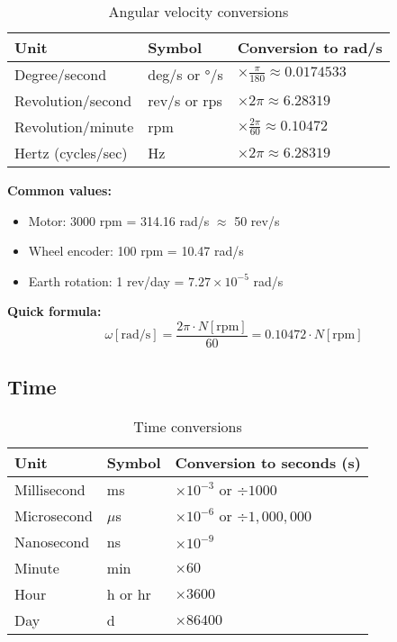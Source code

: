 \begin{table}[H]
\centering
\begin{tabular}{|l|l|l|}
\hline
\rowcolor{blue!20}
\textbf{Unit} & \textbf{Symbol} & \textbf{Conversion to rad/s} \\
\hline
Degree/second & deg/s or °/s & $\times \frac{\pi}{180} \approx 0.0174533$ \\
\hline
Revolution/second & rev/s or rps & $\times 2\pi \approx 6.28319$ \\
\hline
Revolution/minute & rpm & $\times \frac{2\pi}{60} \approx 0.10472$ \\
\hline
Hertz (cycles/sec) & Hz & $\times 2\pi \approx 6.28319$ \\
\hline
\end{tabular}
\caption{Angular velocity conversions}
\end{table}

\textbf{Common values:}
\begin{itemize}
    \item Motor: 3000 rpm = 314.16 rad/s $\approx$ 50 rev/s
    \item Wheel encoder: 100 rpm = 10.47 rad/s
    \item Earth rotation: 1 rev/day = $7.27 \times 10^{-5}$ rad/s
\end{itemize}

\textbf{Quick formula:}
\begin{equation}
\omega[\text{rad/s}] = \frac{2\pi \cdot N[\text{rpm}]}{60} = 0.10472 \cdot N[\text{rpm}]
\end{equation}

\subsection{Time}

\begin{table}[H]
\centering
\begin{tabular}{|l|l|l|}
\hline
\rowcolor{blue!20}
\textbf{Unit} & \textbf{Symbol} & \textbf{Conversion to seconds (s)} \\
\hline
Millisecond & ms & $\times 10^{-3}$ or $\div 1000$ \\
\hline
Microsecond & $\mu$s & $\times 10^{-6}$ or $\div 1{,}000{,}000$ \\
\hline
Nanosecond & ns & $\times 10^{-9}$ \\
\hline
Minute & min & $\times 60$ \\
\hline
Hour & h or hr & $\times 3600$ \\
\hline
Day & d & $\times 86400$ \\
\hline
\end{tabular}
\caption{Time conversions}
\end{table}

